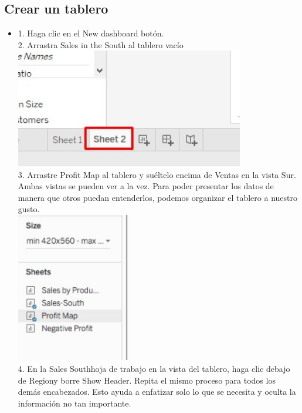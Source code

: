 \documentclass[preprint,12pt]{elsarticle}
\begin{document}
	\subsection{Crear un tablero}
	\begin{itemize}
		\item 
		1. Haga clic en el New dashboard botón.
		\\ 2. Arrastra Sales in the South al tablero vacío
			\\	\includegraphics[width=10cm]{./IMAGENES/7.1.1}
		\\ 3. Arrastre Profit Map al tablero y suéltelo encima de Ventas en la vista Sur. Ambas vistas se
		pueden ver a la vez. Para poder presentar los datos de manera que otros puedan entenderlos,
		podemos organizar el tablero a nuestro gusto.
			\\	\includegraphics[width=5cm]{./IMAGENES/7.1.2}
		\\ 4. En la Sales Southhoja de trabajo en la vista del tablero, haga clic debajo de Regiony
		borre Show Header. Repita el mismo proceso para todos los demás encabezados. Esto ayuda a
		enfatizar solo lo que se necesita y oculta la información no tan importante.

\end{itemize}
\end{document}
